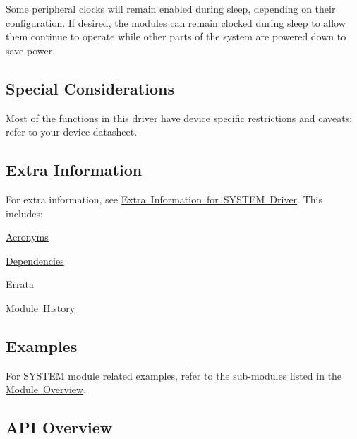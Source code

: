 Some peripheral clocks will remain enabled during sleep, depending on their configuration. If desired, the modules can remain clocked during sleep to allow them continue to operate while other parts of the system are powered down to save power.\hypertarget{group__asfdoc__sam0__system__group_asfdoc_sam0_system_special_considerations}{}\subsection{Special Considerations}\label{group__asfdoc__sam0__system__group_asfdoc_sam0_system_special_considerations}
Most of the functions in this driver have device specific restrictions and caveats; refer to your device datasheet.\hypertarget{group__asfdoc__sam0__system__group_asfdoc_sam0_system_extra_info}{}\subsection{Extra Information}\label{group__asfdoc__sam0__system__group_asfdoc_sam0_system_extra_info}
For extra information, see \mbox{\hyperlink{asfdoc_sam0_system_extra}{Extra Information for S\+Y\+S\+T\+EM Driver}}. This includes\+:
\begin{DoxyItemize}
\item \mbox{\hyperlink{asfdoc_sam0_system_extra_asfdoc_sam0_system_extra_acronyms}{Acronyms}}
\item \mbox{\hyperlink{asfdoc_sam0_system_extra_asfdoc_sam0_system_extra_dependencies}{Dependencies}}
\item \mbox{\hyperlink{asfdoc_sam0_system_extra_asfdoc_sam0_system_extra_errata}{Errata}}
\item \mbox{\hyperlink{asfdoc_sam0_system_extra_asfdoc_sam0_system_extra_history}{Module History}}
\end{DoxyItemize}\hypertarget{group__asfdoc__sam0__system__group_asfdoc_sam0_system_examples}{}\subsection{Examples}\label{group__asfdoc__sam0__system__group_asfdoc_sam0_system_examples}
For S\+Y\+S\+T\+EM module related examples, refer to the sub-\/modules listed in the \mbox{\hyperlink{group__asfdoc__sam0__system__group_asfdoc_sam0_system_module_overview}{Module Overview}}.\hypertarget{group__asfdoc__sam0__system__group_asfdoc_sam0_system_api_overview}{}\subsection{A\+P\+I Overview}\label{group__asfdoc__sam0__system__group_asfdoc_sam0_system_api_overview}



